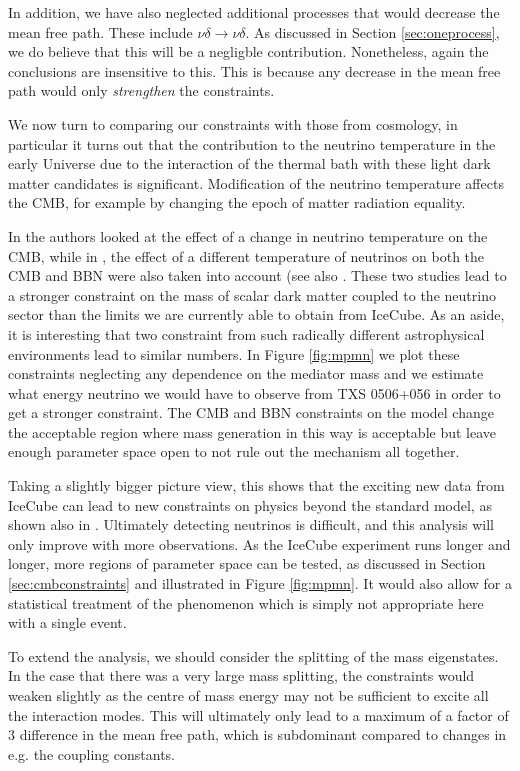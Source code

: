 \documentclass[11pt]{article}
\numberwithin{equation}{section}
\numberwithin{figure}{section}
\numberwithin{table}{section}
\begin{document}
In addition, we have also neglected additional processes that would decrease the mean free path. These include $\nu\delta \rightarrow \nu\delta$. As discussed in Section \ref{sec:oneprocess}, we do believe that this will be a negligble contribution. Nonetheless, again the conclusions are insensitive to this. This is because any decrease in the mean free path would only \emph{strengthen} the constraints.

We now turn to comparing our constraints with those from cosmology, in particular it turns out that the contribution to the neutrino temperature in the early Universe due to the interaction of the thermal bath with these light dark matter candidates is significant.  Modification of the neutrino temperature affects the CMB, for example by changing the epoch of matter radiation equality.

In \cite{Boehm} the authors looked at the effect of a change in neutrino temperature on the CMB, while in \cite{Nollett2015}, the effect of a different temperature of neutrinos on both the CMB and BBN were also taken into account (see also \cite{Escudero2019}. These two studies lead to a stronger constraint on the mass of scalar dark matter coupled to the neutrino sector than the limits we are currently able to obtain from IceCube.  As an aside, it is interesting that two constraint from such radically different astrophysical environments lead to similar numbers. In Figure \ref{fig:mpmn} we plot these constraints neglecting any dependence on the mediator mass and we estimate what energy neutrino we would have to observe from TXS 0506+056 in order to get a stronger constraint. The CMB and BBN constraints on the model change the acceptable region where mass generation in this way is acceptable but leave enough parameter space open to not rule out the mechanism all together.


Taking a slightly bigger picture view, this shows that the exciting new data from IceCube can lead to new constraints on physics beyond the standard model, as shown also in \cite{Kelly}. Ultimately detecting neutrinos is difficult, and this analysis will only improve with more observations. As the IceCube experiment runs longer and longer, more regions of parameter space can be tested, as discussed in Section \ref{sec:cmbconstraints} and illustrated in Figure \ref{fig:mpmn}. It would also allow for a statistical treatment of the phenomenon which is simply not appropriate here with a single event.

To extend the analysis, we should consider the splitting of the mass eigenstates. In the case that there was a very large mass splitting, the constraints would weaken slightly as the centre of mass energy may not be sufficient to excite all the interaction modes. This will ultimately only lead to a maximum of a factor of $3$ difference in the mean free path, which is subdominant compared to changes in e.g. the coupling constants.
\end{document}
